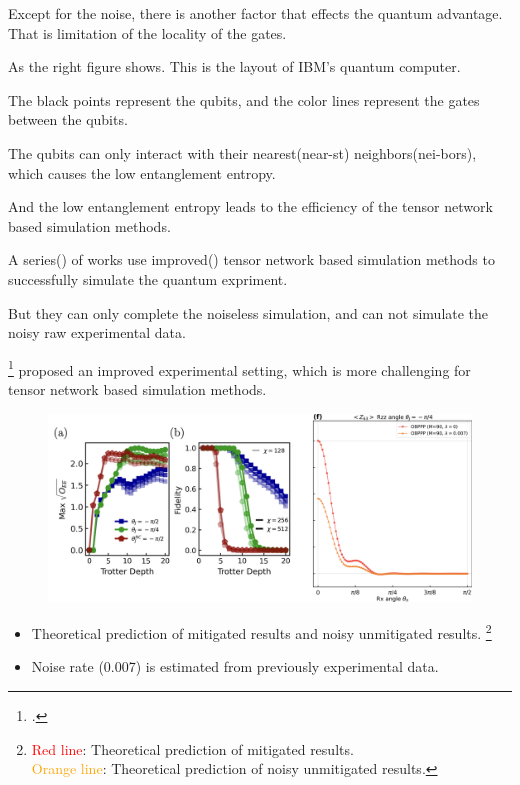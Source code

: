 \documentclass[10pt]{beamer}
\begin{document}
\begin{CJK}{UTF8}{gbsn}
{  Except for the noise, there is another factor that effects the quantum advantage. That is limitation of the locality of the gates.
  
As the right figure shows. This is the layout of IBM's quantum computer.

The black points represent the qubits, and the color lines represent the gates between the qubits.

The qubits can only interact with their nearest(near-st) neighbors(nei-bors), which causes the low entanglement entropy.

And the low entanglement entropy leads to the efficiency of the tensor network based simulation methods.


  A series() of works use improved() tensor network based simulation methods to successfully simulate the quantum expriment.

  But they can only complete the noiseless simulation, and can not simulate the noisy raw experimental data.
}

  \begin{frame}
  \cite{anand2023classical}\footcite{anand2023classical} proposed an improved experimental setting, which is more challenging for tensor network based simulation methods. 
    \begin{figure}
      \centering
    \includegraphics[width=\textwidth]{fig/simibm3.png}
    \end{figure}
  \begin{itemize}
    \item Theoretical prediction of mitigated results and noisy unmitigated results. \footnote{\textcolor{red}{Red line}: Theoretical prediction of mitigated results. \\
    \textcolor{orange}{Orange line}: Theoretical prediction of noisy unmitigated results.}
    \item Noise rate (0.007) is estimated from previously experimental data.
  \end{itemize}
  \vspace{1em}
\end{frame}
\end{CJK}
\end{document}
